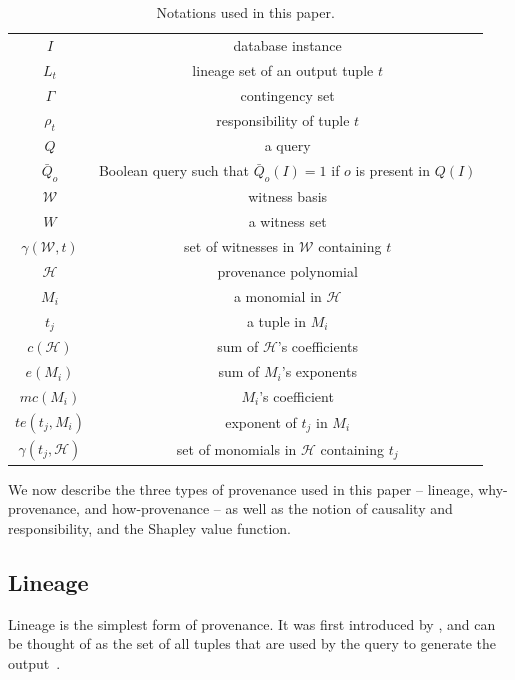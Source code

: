 \documentclass[preprint,12pt,sort&compress]{elsarticle}
\newcommand{\rone}[1]{\textcolor{reviewer1}{#1}}
\newcommand{\rtwo}[1]{\textcolor{reviewer2}{#1}}
\begin{document}
\begin{table}[]
    \centering
    \begin{tabular}{c|c}
    \hline
    	 $I$ & database instance \\
    	 $L_t$ & lineage set of an output tuple $t$ \\
    	 $\Gamma$ & contingency set \\
    	 $\rho_t$ & responsibility of tuple $t$ \\
    	 $Q$ & a query \\
    	 $\bar{Q}_{o}$ & Boolean query such that $\bar{Q}_{o}(I) = 1$ if $o$ is present in $Q(I)$ \\
    	 $\mathcal{W}$ & witness basis \\
    	 $W$ & a witness set \\
    	 $\gamma(\mathcal{W}, t)$ & set of witnesses in $\mathcal{W}$ containing $t$ \\
         $\mathcal{H}$ & provenance polynomial  \\
         $M_i$ & a monomial in $\mathcal{H}$ \\
         $t_j$ & a tuple in $M_i$ \\
         $c(\mathcal{H})$ & sum of $\mathcal{H}$'s coefficients \\
         $e(M_i)$ & sum of $M_i$'s exponents \\
         $mc(M_i)$ & $M_i$'s coefficient \\
         $te(t_j, M_i)$ & exponent of $t_j$ in $M_i$ \\
         $\gamma(t_j, \mathcal{H})$ & set of monomials in $\mathcal{H}$ containing $t_j$ \\
    \hline
    \end{tabular}
   \caption{\rone{Notations used in this paper.}}    \label{tab:notation}
\end{table}


We now describe the three types of provenance used in this paper --  lineage, why-provenance, and how-provenance -- as well as
\rtwo{the notion of causality and responsibility, and the Shapley value function}. 

\subsection{Lineage}
\rone{Lineage is the simplest form of provenance. It was first introduced by \citet{lineageCui}, and can be thought of as the set of all tuples that
are used by the query to generate the output~\cite{CheneyProvSurvey}.}
\end{document}
